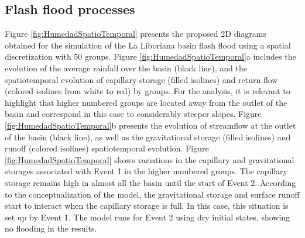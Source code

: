 \documentclass[hess, manuscript]{copernicus}
\begin{document}
\subsection{Flash flood processes}


Figure \ref{fig:HumedadSpatioTemporal} presents the proposed 2D diagrams obtained for the simulation of the La Liboriana basin flash flood using a spatial discretization with 50 groups. Figure \ref{fig:HumedadSpatioTemporal}a includes the evolution of the average rainfall over the basin (black line), and the spatiotemporal evolution of capillary storage (filled isolines) and return flow (colored isolines from white to red) by groups. For the analysis, it is relevant to highlight that higher numbered groups are located away from the outlet of the basin and correspond in this case to considerably steeper slopes. Figure \ref{fig:HumedadSpatioTemporal}b presents the evolution of streamflow at the outlet of the basin (black line), as well as the gravitational storage (filled isolines) and runoff (colored isolines) spatiotemporal evolution. Figure \ref{fig:HumedadSpatioTemporal} shows variations in the capillary and gravitational storages associated with Event 1 in the higher numbered groups. The capillary storage remains high in almost all the basin until the start of Event 2. According to the conceptualization of the model, the gravitational storage and surface runoff start to interact when the capillary storage is full. In this case, this situation is set up by Event 1. The model runs for Event 2 using dry initial states, showing no flooding in the results.\\
\end{document}
